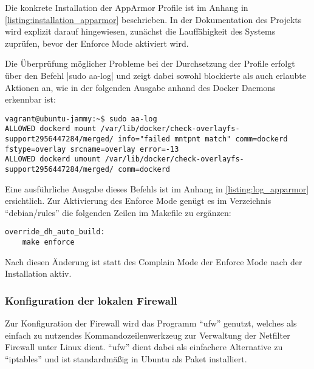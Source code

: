 Die konkrete Installation der AppArmor Profile ist im Anhang in \autoref{listing:installation_apparmor} beschrieben. In der Dokumentation des Projekts wird explizit darauf hingewiesen, zunächst die Lauffähigkeit des Systems zuprüfen, bevor der Enforce Mode aktiviert wird.

Die Überprüfung möglicher Probleme bei der Durchsetzung der Profile erfolgt über den Befehl |sudo aa-log|
und zeigt dabei sowohl blockierte als auch erlaubte Aktionen an, wie in der folgenden Ausgabe anhand des Docker Daemons erkennbar ist:

\begin{verbatim}
vagrant@ubuntu-jammy:~$ sudo aa-log 
ALLOWED dockerd mount /var/lib/docker/check-overlayfs-support2956447284/merged/ info="failed mntpnt match" comm=dockerd fstype=overlay srcname=overlay error=-13
ALLOWED dockerd umount /var/lib/docker/check-overlayfs-support2956447284/merged/ comm=dockerd
\end{verbatim}

Eine ausführliche Ausgabe dieses Befehls ist im Anhang in \autoref{listing:log_apparmor} ersichtlich. Zur Aktivierung des Enforce Mode genügt es im Verzeichnis \enquote{debian/rules} die folgenden Zeilen im Makefile zu ergänzen:

\begin{verbatim}
override_dh_auto_build:
    make enforce
\end{verbatim}

Nach diesen Änderung ist statt des Complain Mode der Enforce Mode nach der Installation aktiv.

\subsubsection{Konfiguration der lokalen Firewall}

Zur Konfiguration der Firewall wird das Programm \enquote{ufw} genutzt, welches als einfach zu nutzendes Kommandozeilenwerkzeug zur Verwaltung der Netfilter Firewall unter Linux dient. \enquote{ufw} dient dabei als einfachere Alternative zu \enquote{iptables} und ist standardmäßig in Ubuntu als Paket installiert.

